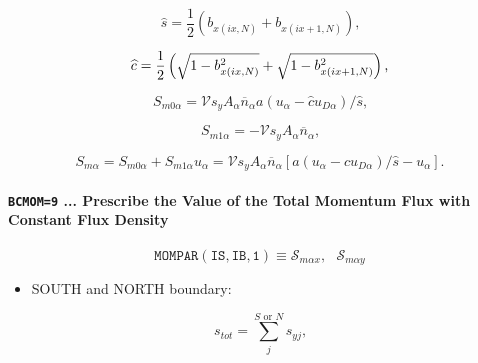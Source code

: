 \documentclass[11pt]{article}
\begin{document}
\begin{equation}
\widehat{s}=\frac{1}{2}\left( b_{x\left( ix,N\right) }+b_{x\left(
ix+1,N\right) }\right) \text{,}   \label{c144}
\end{equation}

\begin{equation}
\widehat{c}=\frac{1}{2}\left( \sqrt{1-b_{x\left( ix,N\right) }^{2}}+\sqrt{%
1-b_{x\left( ix+1,N\right) }^{2}}\right) \text{,}   \label{c145}
\end{equation}

\begin{equation}
S_{m0\alpha}=\mathcal{V}s_{y}A_{\alpha}\overline{n}_{\alpha}a\left(
u_{\alpha}-\widehat{c}u_{D\alpha}\right) /\widehat{s}\text{,}   \label{c146}
\end{equation}

\begin{equation}
S_{m1\alpha}=-\mathcal{V}s_{y}A_{\alpha}\overline{n}_{\alpha}\text{,} 
\label{c147}
\end{equation}

\begin{equation}
S_{m\alpha}=S_{m0\alpha}+S_{m1\alpha}u_{\alpha}=\mathcal{V}s_{y}A_{\alpha }%
\overline{n}_{\alpha}\left[ a\left( u_{\alpha}-\widehat{c}u_{D\alpha
}\right) /\widehat{s}-u_{\alpha}\right] \text{.}   \label{c148}
\end{equation}

\bigskip

\paragraph{\texttt{BCMOM=9} ... Prescribe the Value of the Total Momentum
Flux with Constant Flux Density}

\bigskip

\begin{equation*}
\mathtt{MOMPAR(IS,IB,1)}\equiv\mathcal{S}_{m\alpha x},\text{ }\mathcal{S}%
_{m\alpha y}
\end{equation*}

\bigskip

\begin{itemize}
\item  SOUTH and NORTH boundary:
\end{itemize}

\bigskip

\begin{equation}
s_{tot}=\sum_{j}^{S\text{ or }N}s_{yj}\text{,}   \label{c149}
\end{equation}
\end{document}

